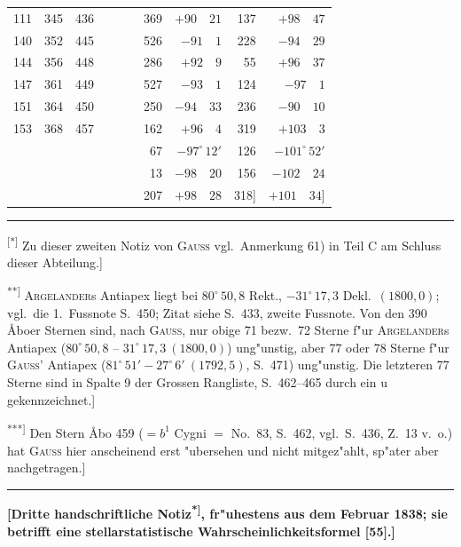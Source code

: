 \documentclass[12pt,a4paper]{article}
\theoremstyle{plain}
\theoremstyle{definition}
\theoremstyle{remark}
\begin{document}
\begin{center}
\begin{tabular}{|rrr|rrr||rr|rr|}
111 & 345 & 436 & & & & 369 & $+90\quad 21$ & 137 & $+98\quad 47$\\
140 & 352 & 445 & & & & 526 & $-91\quad 1$ & 228 & $-94\quad 29$\\
144 & 356 & 448 & & & & 286 & $+92\quad 9$ & 55 & $+96\quad 37$\\
147 & 361 & 449 & & & & 527 & $-93\quad 1$ & 124 & $-97\quad 1$\\
151 & 364 & 450 & & & & 250 & $-94\quad 33$ & 236 & $-90\quad 10$\\
153 & 368 & 457 & & & & 162 & $+96\quad 4$ & 319 & $+103\quad 3$\\
\hline
\multicolumn{6}{|c||}{} & 67 & $-97^{\circ}\,12'$ & 126 & $-101^{\circ}\,52'$\\
\multicolumn{6}{|c||}{} & 13 & $-98\quad 20$ & 156 & $-102\quad 24$\\
\multicolumn{6}{|c||}{} & 207 & $+98\quad 28$ & 318] & $+101\quad 34$]\\
\hline
\end{tabular}
\end{center}

\rule{\textwidth}{0.4pt}
{\small
\textsuperscript{[*]} Zu dieser zweiten Notiz von \textsc{Gauss} vgl.\ Anmerkung 61) in Teil C am Schluss dieser Abteilung.]

\textsuperscript{**]} \textsc{Argelander}s Antiapex liegt bei $80^{\circ}\,50{,}8$ Rekt., $-31^{\circ}\,17{,}3$ Dekl.\ $(1800{,}0)$; vgl.\ die 1.\ Fussnote S.\ 450; Zitat siehe S.\ 433, zweite Fussnote. Von den 390 \AA{}boer Sternen sind, nach \textsc{Gauss}, nur obige 71 bezw.\ 72 Sterne f"ur \textsc{Argelander}s Antiapex ($80^{\circ}\,50{,}8$ -- $31^{\circ}\,17{,}3\ (1800{,}0)$) ung"unstig, aber 77 oder 78 Sterne f"ur \textsc{Gauss}' Antiapex ($81^{\circ}\,51' - 27^{\circ}\,6'\ (1792{,}5)$, S.\ 471) ung"unstig. Die letzteren 77 Sterne sind in Spalte 9 der Grossen Rangliste, S.\ 462--465 durch ein u gekennzeichnet.]

\textsuperscript{***]} Den Stern \AA{}bo 459 ($= b^1$ Cygni $=$ No.\ 83, S.\ 462, vgl.\ S.\ 436, Z.\ 13 v.\ o.) hat \textsc{Gauss} hier anscheinend erst "ubersehen und nicht mitgez"ahlt, sp"ater aber nachgetragen.]
}
\rule{\textwidth}{0.4pt}


\newpage
\begin{center}
\textbf{[Dritte handschriftliche Notiz\textsuperscript{*]}, fr"uhestens aus dem Februar 1838; sie betrifft eine stellarstatistische Wahrscheinlichkeitsformel [55].]}
\end{center}
\end{document}
